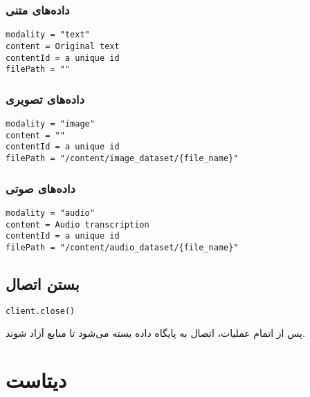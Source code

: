 \documentclass{article}
\begin{document}
\subsubsection*{داده‌های متنی}
\begin{latin}
\begin{verbatim}
modality = "text"
content = Original text
contentId = a unique id
filePath = ""
\end{verbatim}
\end{latin}

\subsubsection*{داده‌های تصویری}
\begin{latin}
\begin{verbatim}
modality = "image"
content = ""
contentId = a unique id
filePath = "/content/image_dataset/{file_name}"
\end{verbatim}
\end{latin}

\subsubsection*{داده‌های صوتی}
\begin{latin}
\begin{verbatim}
modality = "audio"
content = Audio transcription
contentId = a unique id
filePath = "/content/audio_dataset/{file_name}"
\end{verbatim}
\end{latin}


\subsection{بستن اتصال}

\begin{latin}
\begin{lstlisting}[language=python]
client.close()
\end{lstlisting}
\end{latin}

پس از اتمام عملیات، اتصال به پایگاه داده بسته می‌شود تا منابع آزاد شوند.




\section{دیتاست‌}
\end{document}
